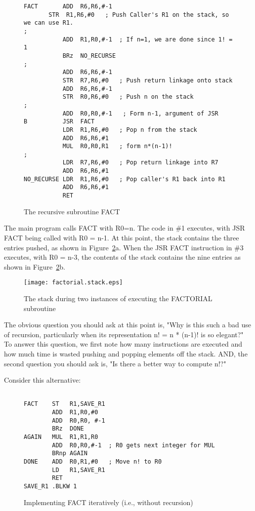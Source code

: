 \documentclass{patt}
\begin{document}
\begin{figure}[h!]
\begin{minipage}{36pc}
\begin{Verbatim}[fontsize=\fontsize{9}{11}\selectfont]
FACT       ADD  R6,R6,#-1
	   STR  R1,R6,#0   ; Push Caller's R1 on the stack, so we can use R1.
;
           ADD  R1,R0,#-1  ; If n=1, we are done since 1! = 1
           BRz  NO_RECURSE  
;
           ADD  R6,R6,#-1
           STR  R7,R6,#0   ; Push return linkage onto stack
           ADD  R6,R6,#-1
           STR  R0,R6,#0   ; Push n on the stack
;
           ADD  R0,R0,#-1   ; Form n-1, argument of JSR           
B          JSR  FACT
           LDR  R1,R6,#0   ; Pop n from the stack
           ADD  R6,R6,#1
           MUL  R0,R0,R1   ; form n*(n-1)!
;
           LDR  R7,R6,#0   ; Pop return linkage into R7
           ADD  R6,R6,#1
NO_RECURSE LDR  R1,R6,#0   ; Pop caller's R1 back into R1
           ADD  R6,R6,#1
           RET
\end{Verbatim}
\caption{The recursive subroutine FACT}
\label{fig:recursiveFACT}
\end{minipage}
\end{figure}

The main program calls FACT with R0=n.  The code in \#1 executes, with 
JSR FACT being called with R0 = n-1.  At this point, the stack contains the 
three entries pushed, as shown in Figure~\ref{fig:factorial.stack}a.  When 
the JSR FACT instruction in \#3 executes, with R0 = n-3, the contents of the 
stack contains the nine entries as shown in Figure~\ref{fig:factorial.stack}b.

\begin{figure}[h]
\centerline{\texttt{[image: factorial.stack.eps]}}
\caption{The stack during two instances of executing the FACTORIAL subroutine}
\label{fig:factorial.stack}
\end{figure}

\FloatBarrier
The obvious question you should ask at this point is, "Why is this such a
bad use of recursion, particularly when its representation n! = n * (n-1)!
is so elegant?"  To answer this question, we first note how many
instructions are executed and how much time is wasted pushing and popping
elements off the stack.  AND, the second question you should ask is, "Is there 
a better way to compute n!?"

Consider this alternative:

\begin{figure}[h!]
\begin{minipage}{36pc}
\begin{Verbatim}[fontsize=\fontsize{9}{11}\selectfont]

FACT    ST   R1,SAVE_R1
        ADD  R1,R0,#0
        ADD  R0,R0, #-1
        BRz  DONE
AGAIN   MUL  R1,R1,R0
        ADD  R0,R0,#-1  ; R0 gets next integer for MUL
        BRnp AGAIN
DONE    ADD  R0,R1,#0   ; Move n! to R0
        LD   R1,SAVE_R1
        RET
SAVE_R1 .BLKW 1
\end{Verbatim}
\caption{Implementing FACT iteratively (i.e., without recursion)                    }
\label{fig:zzzzzz}
\end{minipage}
\end{figure}
\end{document}
